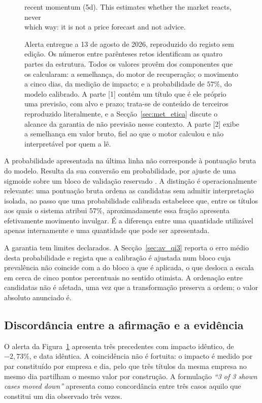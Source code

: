 \begin{figure}[ht]
\begin{tcolorbox}[colback=black!3, colframe=black!35, boxrule=0.4pt, arc=2pt,
                  width=0.97\textwidth, fontupper=\ttfamily\scriptsize]
\hspace*{1em}recent momentum (5d). This estimates whether the market reacts, never\\
\hspace*{1em}which way: it is not a price forecast and not advice.
\end{tcolorbox}
\caption[Alerta entregue ao canal]{Alerta entregue a 13 de agosto de 2026, reproduzido do registo
sem edição. Os números entre parênteses retos identificam as quatro partes da estrutura. Todos os
valores provêm dos componentes que os calcularam: a semelhança, do motor de recuperação; o
movimento a cinco dias, da medição de impacto; e a probabilidade de $57\%$, do modelo calibrado. A
parte \textnormal{[1]} contém um título que é ele próprio uma previsão, com alvo e prazo; trata-se
de conteúdo de terceiros reproduzido literalmente, e a Secção~\ref{sec:met_etica} discute o
alcance da garantia de não previsão nesse contexto. A parte \textnormal{[2]} exibe a semelhança em
valor bruto, fiel ao que o motor calculou e não interpretável por quem a lê.}
\label{fig:sis_alerta}
\end{figure}

A probabilidade apresentada na última linha não corresponde à pontuação bruta do modelo. Resulta
da sua conversão em probabilidade, por ajuste de uma sigmoide sobre um bloco de validação
reservado \autocite{niculescu2005calibration}. A distinção é operacionalmente relevante: uma
pontuação bruta ordena as candidatas sem admitir interpretação isolada, ao passo que uma
probabilidade calibrada estabelece que, entre os títulos aos quais o sistema atribui $57\%$,
aproximadamente essa fração apresenta efetivamente movimento invulgar. É a diferença entre uma
quantidade utilizável apenas internamente e uma quantidade que pode ser apresentada.

A garantia tem limites declarados. A Secção~\ref{sec:av_qi3} reporta o erro médio desta
probabilidade e regista que a calibração é ajustada num bloco cuja prevalência não coincide com a
do bloco a que é aplicada, o que desloca a escala em cerca de cinco pontos percentuais no sentido
otimista. A ordenação entre candidatas não é afetada, uma vez que a transformação preserva a
ordem; o valor absoluto anunciado é.

\subsection{Discordância entre a afirmação e a evidência}

O alerta da Figura~\ref{fig:sis_alerta} apresenta três precedentes com impacto idêntico, de
$-2{,}73\%$, e data idêntica. A coincidência não é fortuita: o impacto é medido por par
constituído por empresa e dia, pelo que três títulos da mesma empresa no mesmo dia partilham o
mesmo valor por construção. A formulação \emph{``3 of 3 shown cases moved down''} apresenta como
concordância entre três casos aquilo que constitui um dia observado três vezes.

